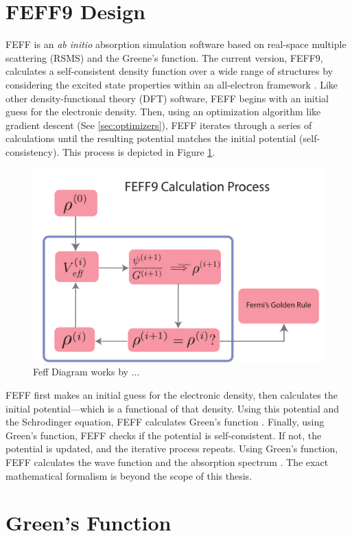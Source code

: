 \section{FEFF9 Design}

FEFF is an \textit{ab initio} absorption simulation software based on real-space multiple scattering (RSMS) and the Greene's function. The current version, FEFF9, calculates a self-consistent density function over a wide range of structures by considering the excited state properties within an all-electron framework \cite{feff-new-dev}. Like other density-functional theory (DFT) software, FEFF begins with an initial guess for the electronic density. Then, using an optimization algorithm like gradient descent (See \ref{sec:optimizers}), FEFF iterates through a series of calculations until the resulting potential matches the initial potential (self-consistency). This process is depicted in Figure \ref{fig:feff-dft-diagram}.

\begin{figure}
    \centering
    \includegraphics[width=\linewidth]{Chapters/Figures/dft-feff-diagram.pdf}
    \caption[FEFF Diagram]{Feff Diagram works by ...}
    \label{fig:feff-dft-diagram}
\end{figure}

FEFF first makes an initial guess for the electronic density, then calculates the initial potential---which is a functional of that density. Using this potential and the Schrodinger equation, FEFF calculates Green's function \cite{greens-function-xafs-2021}. Finally, using Green's function, FEFF checks if the potential is self-consistent. If not, the potential is updated, and the iterative process repeats. Using Green's function, FEFF calculates the wave function and the absorption spectrum \cite{feff-citation} \cite{rehr2010parameter}. The exact mathematical formalism is beyond the scope of this thesis.

\section{Green's Function}



